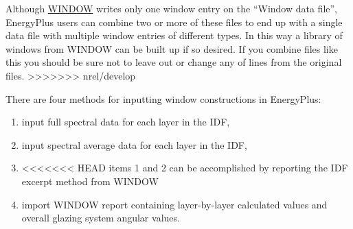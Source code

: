 Although \href{https://windows.lbl.gov/software-tools#window-heading}{WINDOW} writes only one window entry on the ``Window data file'', EnergyPlus users can combine two or more of these files to end up with a single data file with multiple window entries of different types. In this way a library of windows from WINDOW can be built up if so desired. If you combine files like this you should be sure not to leave out or change any of lines from the original files.
>>>>>>> nrel/develop

There are four methods for inputting window constructions in EnergyPlus:

\begin{enumerate}
\tightlist
\item
  input full spectral data for each layer in the IDF,
\item
  input spectral average data for each layer in the IDF,
\item
<<<<<<< HEAD
  items 1 and 2 can be accomplished by reporting the IDF excerpt method from WINDOW
\item
  import WINDOW report containing layer-by-layer calculated values and overall glazing system angular values.
\end{enumerate}

